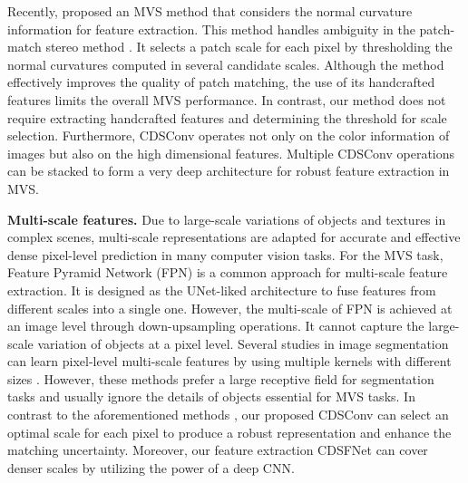 \documentclass{article} \usepackage{iclr2022_conference,times}
\begin{document}
Recently, \cite{xu2020marmvs} proposed an MVS method that considers the normal curvature information for feature extraction. This method handles ambiguity in the patch-match stereo method \citep{barnes2009patchmatch}. It selects a patch scale for each pixel by thresholding the normal curvatures computed in several candidate scales. Although the method effectively improves the quality of patch matching, the use of its handcrafted features limits the overall MVS performance. In contrast, our method does not require extracting handcrafted features and determining the threshold for scale selection. Furthermore, CDSConv operates not only on the color information of images but also on the high dimensional features. Multiple CDSConv operations can be stacked to form a very deep architecture for robust feature extraction in MVS.

\textbf{Multi-scale features.} Due to large-scale variations of objects and textures in complex scenes, multi-scale representations are adapted for accurate and effective dense pixel-level prediction in many computer vision tasks. For the MVS task, Feature Pyramid Network (FPN) \citep{lin2017feature,gu2020cascade,cheng2020deep,zhang2020visibility,luo2020attention} is a common approach for multi-scale feature extraction. It is designed as the UNet-liked architecture \citep{ronneberger2015u} to fuse features from different scales into a single one. However, the multi-scale of FPN is achieved at an image level through down-upsampling operations. It cannot capture the large-scale variation of objects at a pixel level. Several studies in image segmentation can learn pixel-level multi-scale features by using multiple kernels with different sizes \citep{he2019dynamic,liu2016ssd,chen2017deeplab,zhao2017pyramid}. However, these methods prefer a large receptive field for segmentation tasks and usually ignore the details of objects essential for MVS tasks. In contrast to the aforementioned methods \citep{gu2020cascade,cheng2020deep,zhang2020visibility,luo2020attention,he2019dynamic}, our proposed CDSConv can select an optimal scale for each pixel to produce a robust representation and enhance the matching uncertainty. Moreover, our feature extraction CDSFNet can cover denser scales by utilizing the power of a deep CNN.
\end{document}
